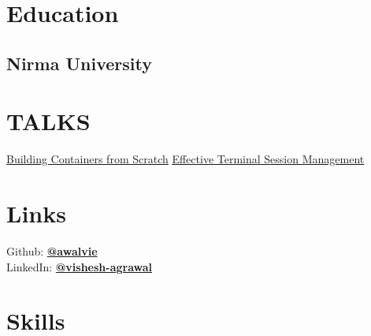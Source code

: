 \documentclass[]{config}
\begin{document}
%
%

%
%

\begin{minipage}[t]{0.33\textwidth}


\section{Education}

\subsection{Nirma University}


\section{TALKS}
	\renewcommand{\ULdepth}{1.8pt}
	\href{https://www.youtube.com/watch?v=GFUpXhft8zA}{\uline{Building Containers from Scratch}}
	\href{https://www.youtube.com/watch?v=oWoKy3Zjai0}{\uline{Effective Terminal Session Management}}


\section{Links}
Github: \href{https://github.com/awalvie}{\bf @awalvie} \\
LinkedIn:  \href{https://www.linkedin.com/in/vishesh-agrawal}{\bf @vishesh-agrawal} \\


\section{Skills}


\end{minipage}
\end{document}
